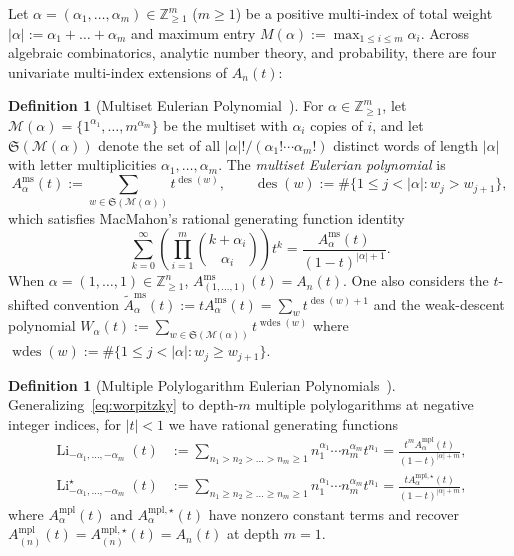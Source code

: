 \documentclass[11pt]{article}
\theoremstyle{definition}
\newtheorem{definition}[theorem]{Definition}
\newcommand{\ZZ}{\mathbb{Z}}
\newcommand{\des}{\operatorname{des}}
\newcommand{\wdes}{\operatorname{wdes}}
\newcommand{\Li}{\operatorname{Li}}
\begin{document}
Let $\alpha = (\alpha_1, \dots, \alpha_m) \in \ZZ_{\ge 1}^m$ ($m \ge 1$) be a positive
multi-index of total weight $|\alpha| := \alpha_1 + \dots + \alpha_m$ and maximum entry
$M(\alpha) := \max_{1 \le i \le m} \alpha_i$. Across algebraic combinatorics, analytic
number theory, and probability, there are four univariate multi-index extensions of $A_n(t)$:

\begin{definition}[Multiset Eulerian Polynomial~\cite{MacMahon1915,DillonRoselle1969,Simion1984}]\label{def:multiset-eulerian}
For $\alpha \in \ZZ_{\ge 1}^m$, let $\mathcal{M}(\alpha) = \{1^{\alpha_1}, \dots, m^{\alpha_m}\}$
be the multiset with $\alpha_i$ copies of $i$, and let $\mathfrak{S}(\mathcal{M}(\alpha))$ denote
the set of all $|\alpha|! / (\alpha_1! \cdots \alpha_m!)$ distinct words of length $|\alpha|$
with letter multiplicities $\alpha_1,\dots,\alpha_m$. The \emph{multiset Eulerian polynomial}
is
\begin{equation}\label{eq:ms-def}
  A_\alpha^{\mathrm{ms}}(t) := \sum_{w \in \mathfrak{S}(\mathcal{M}(\alpha))} t^{\des(w)},
  \qquad \des(w) := \#\{1 \le j < |\alpha| : w_j > w_{j+1}\},
\end{equation}
which satisfies MacMahon's rational generating function identity
\begin{equation}\label{eq:macmahon}
  \sum_{k=0}^{\infty} \left(\prod_{i=1}^{m} \binom{k + \alpha_i}{\alpha_i}\right) t^k
  = \frac{A_\alpha^{\mathrm{ms}}(t)}{(1-t)^{|\alpha|+1}}.
\end{equation}
When $\alpha = (1,\dots,1) \in \ZZ_{\ge 1}^n$, $A_{(1,\dots,1)}^{\mathrm{ms}}(t) = A_n(t)$.
One also considers the $t$-shifted convention $\tilde{A}_\alpha^{\mathrm{ms}}(t) :=
t A_\alpha^{\mathrm{ms}}(t) = \sum_w t^{\des(w)+1}$ and the weak-descent polynomial
$W_\alpha(t) := \sum_{w \in \mathfrak{S}(\mathcal{M}(\alpha))} t^{\wdes(w)}$ where
$\wdes(w) := \#\{1 \le j < |\alpha| : w_j \ge w_{j+1}\}$.
\end{definition}

\begin{definition}[Multiple Polylogarithm Eulerian Polynomials~\cite{TaNgo2026}]\label{def:mpl-eulerian}
Generalizing~\eqref{eq:worpitzky} to depth-$m$ multiple polylogarithms at negative integer
indices, for $|t| < 1$ we have rational generating functions
\begin{align}
  \Li_{-\alpha_1,\dots,-\alpha_m}(t)
  &:= \sum_{n_1 > n_2 > \dots > n_m \ge 1} n_1^{\alpha_1}\cdots n_m^{\alpha_m} t^{n_1}
  = \frac{t^m A_\alpha^{\mathrm{mpl}}(t)}{(1-t)^{|\alpha|+m}}, \label{eq:mpl-strict}\\
  \Li_{-\alpha_1,\dots,-\alpha_m}^{\star}(t)
  &:= \sum_{n_1 \ge n_2 \ge \dots \ge n_m \ge 1} n_1^{\alpha_1}\cdots n_m^{\alpha_m} t^{n_1}
  = \frac{t A_\alpha^{\mathrm{mpl},\star}(t)}{(1-t)^{|\alpha|+m}}, \label{eq:mpl-star}
\end{align}
where $A_\alpha^{\mathrm{mpl}}(t)$ and $A_\alpha^{\mathrm{mpl},\star}(t)$ have nonzero
constant terms and recover $A_{(n)}^{\mathrm{mpl}}(t) = A_{(n)}^{\mathrm{mpl},\star}(t) =
A_n(t)$ at depth $m=1$.
\end{definition}
\end{document}
